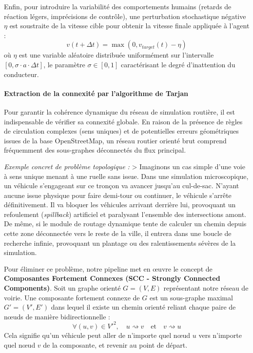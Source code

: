 \documentclass[10pt, a4paper]{article}
\begin{document}
Enfin, pour introduire la variabilité des comportements humains (retards
de réaction légers, imprécisions de contrôle), une perturbation
stochastique négative \(\eta\) est soustraite de la vitesse cible pour
obtenir la vitesse finale appliquée à l'agent :
\[v(t + \Delta t) = \max\left( 0, v_{target}(t) - \eta \right)\] où
\(\eta\) est une variable aléatoire distribuée uniformément sur
l'intervalle \([0, \sigma \cdot a \cdot \Delta t]\), le paramètre
\(\sigma \in [0, 1]\) caractérisant le degré d'inattention du
conducteur.

\paragraph{Extraction de la connexité par l'algorithme de
Tarjan}\label{extraction-de-la-connexituxe9-par-lalgorithme-de-tarjan}

Pour garantir la cohérence dynamique du réseau de simulation routière,
il est indispensable de vérifier sa connexité globale. En raison de la
présence de règles de circulation complexes (sens uniques) et de
potentielles erreurs géométriques issues de la base OpenStreetMap, un
réseau routier orienté brut comprend fréquemment des sous-graphes
déconnectés du flux principal.

\emph{Exemple concret de problème topologique :} \textgreater{}
Imaginons un cas simple d'une voie à sens unique menant à une ruelle
sans issue. Dans une simulation microscopique, un véhicule s'engageant
sur ce tronçon va avancer jusqu'au cul-de-sac. N'ayant aucune issue
physique pour faire demi-tour ou continuer, le véhicule s'arrête
définitivement. Il va bloquer les véhicules arrivant derrière lui,
provoquant un refoulement (\emph{spillback}) artificiel et paralysant
l'ensemble des intersections amont. De même, si le module de routage
dynamique tente de calculer un chemin depuis cette zone déconnectée vers
le reste de la ville, il entrera dans une boucle de recherche infinie,
provoquant un plantage ou des ralentissements sévères de la simulation.

Pour éliminer ce problème, notre pipeline met en œuvre le concept de
\textbf{Composantes Fortement Connexes (SCC - Strongly Connected
Components)}. Soit un graphe orienté \(G = (V, E)\) représentant notre
réseau de voirie. Une composante fortement connexe de \(G\) est un
sous-graphe maximal \(G' = (V', E')\) dans lequel il existe un chemin
orienté reliant chaque paire de nœuds de manière bidirectionnelle :
\[\forall (u, v) \in V'^2, \quad u \rightsquigarrow v \quad \text{et} \quad v \rightsquigarrow u\]
Cela signifie qu'un véhicule peut aller de n'importe quel nœud \(u\)
vers n'importe quel nœud \(v\) de la composante, et revenir au point de
départ.
\end{document}
